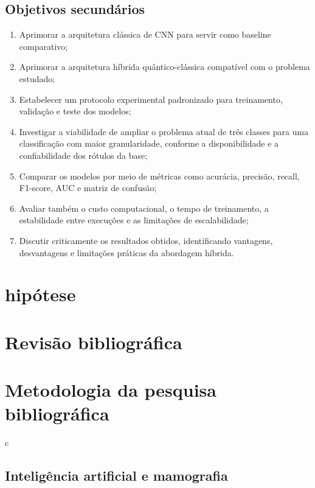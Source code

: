 \documentclass[
    12pt,
    openright,
    oneside,
    a4paper,
    english,
    brazil
]{abntex2}
\begin{document}
\section{Objetivos secundários}
\label{subsec:objetivos_secundarios}

\begin{enumerate}
    \item Aprimorar a arquitetura clássica de CNN para servir como baseline comparativo;
    \item Aprimorar a arquitetura híbrida quântico-clássica compatível com o problema estudado;
    \item Estabelecer um protocolo experimental padronizado para treinamento, validação e teste dos modelos;
    \item Investigar a viabilidade de ampliar o problema atual de três classes para uma classificação com maior granularidade, conforme a disponibilidade e a confiabilidade dos rótulos da base;
    \item Comparar os modelos por meio de métricas como acurácia, precisão, recall, F1-score, AUC e matriz de confusão;
    \item Avaliar também o custo computacional, o tempo de treinamento, a estabilidade entre execuções e as limitações de escalabilidade;
    \item Discutir criticamente os resultados obtidos, identificando vantagens, desvantagens e limitações práticas da abordagem híbrida.
\end{enumerate}


\chapter{hipótese}




\chapter{Revisão bibliográfica}

\chapter{Metodologia da pesquisa bibliográfica}
\label{sec:metodologia_biblio}

c

\section{Inteligência artificial e mamografia}
\end{document}
